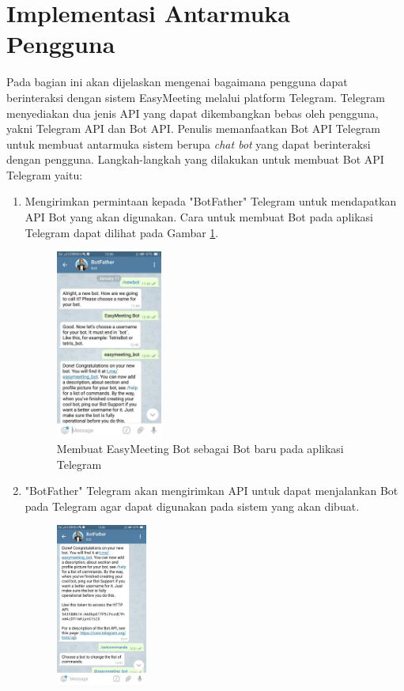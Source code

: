 \section{Implementasi Antarmuka Pengguna}
\tab Pada bagian ini akan dijelaskan mengenai bagaimana pengguna dapat berinteraksi dengan sistem EasyMeeting melalui platform Telegram. Telegram menyediakan dua jenis API yang dapat dikembangkan bebas oleh pengguna, yakni Telegram API dan Bot API. Penulis memanfaatkan Bot API Telegram untuk membuat antarmuka sistem berupa \textit{chat bot} yang dapat berinteraksi dengan pengguna. Langkah-langkah yang dilakukan untuk membuat Bot API Telegram yaitu:
\begin{enumerate}
	\item Mengirimkan permintaan kepada "BotFather" Telegram untuk mendapatkan API Bot yang akan digunakan. Cara untuk membuat Bot pada aplikasi Telegram dapat dilihat pada Gambar \ref{figure:newbot}.
	\begin{figure}[H]
		\centerline {
			\includegraphics[width=3.5cm]{bab5/img/newbot.jpg}
		}
		\caption{Membuat EasyMeeting Bot sebagai Bot baru pada aplikasi Telegram}
		\label{figure:newbot}
	\end{figure}
	\item "BotFather" Telegram akan mengirimkan API untuk dapat menjalankan  Bot pada Telegram agar dapat digunakan pada sistem yang akan dibuat.
	\begin{figure}[H]
		\centerline {
			\includegraphics[width=3cm]{bab5/img/api.jpg}
}
\end{figure}
\end{enumerate}
